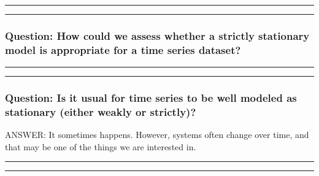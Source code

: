 \documentclass[]{article}
\begin{document}

\begin{center}\rule{0.5\linewidth}{\linethickness}\end{center}

\begin{center}\rule{0.5\linewidth}{\linethickness}\end{center}

\subsubsection{Question: How could we assess whether a strictly
stationary model is appropriate for a time series
dataset?}\label{question-how-could-we-assess-whether-a-strictly-stationary-model-is-appropriate-for-a-time-series-dataset}


\begin{center}\rule{0.5\linewidth}{\linethickness}\end{center}

\begin{center}\rule{0.5\linewidth}{\linethickness}\end{center}

\subsubsection{Question: Is it usual for time series to be well modeled
as stationary (either weakly or
strictly)?}\label{question-is-it-usual-for-time-series-to-be-well-modeled-as-stationary-either-weakly-or-strictly}

ANSWER: It sometimes happens. However, systems often change over time,
and that may be one of the things we are interested in.

\begin{center}\rule{0.5\linewidth}{\linethickness}\end{center}

\begin{center}\rule{0.5\linewidth}{\linethickness}\end{center}
\end{document}

